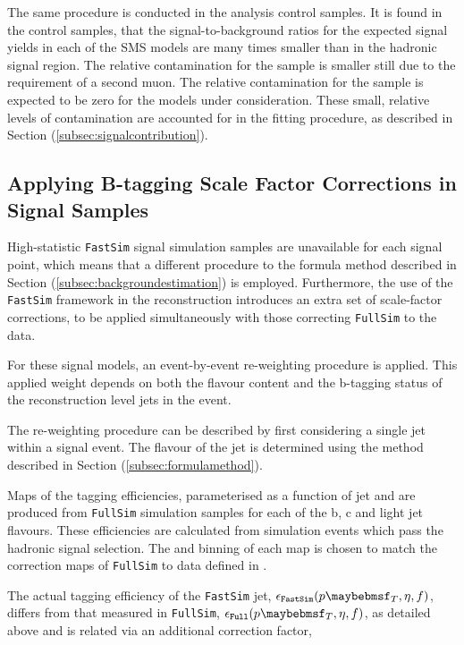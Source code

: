 The same procedure is conducted in the analysis control samples. It is found in the \mupjets control samples, that the signal-to-background ratios for the expected signal yields in each of the \ac{SMS} models are many times smaller than in the hadronic signal region. The relative contamination for the \dimupjets sample is smaller still due to the requirement of a second muon. The relative contamination for the \gpjets sample is expected to be zero for the models under consideration. These small, relative levels of contamination are accounted for in the fitting procedure, as described in Section (\ref{subsec:signalcontribution}).


\subsection{Applying B-tagging Scale Factor Corrections in Signal Samples}
\label{subsec:smsbtagreweighting}

High-statistic \texttt{FastSim} signal simulation samples are unavailable for each signal point, which means that a different procedure to the formula method described in Section (\ref{subsec:backgroundestimation}) is employed. Furthermore, the use of the \texttt{FastSim} framework in the reconstruction introduces an extra set of scale-factor corrections, to be applied simultaneously with those correcting \texttt{FullSim} to the data. 

For these signal models, an event-by-event re-weighting procedure is applied. This applied weight depends on both the flavour content and the b-tagging status of the reconstruction level jets in the event. 

The re-weighting procedure can be described by first considering a single jet within a signal event. The flavour of the jet is determined using the method described in Section (\ref{subsec:formulamethod}). 

Maps of the tagging efficiencies, parameterised as a function of jet \pt and \eta are produced from \texttt{FullSim} simulation samples for each of the b, c and light jet flavours. These efficiencies are calculated from simulation events which pass the hadronic signal selection. The \pt and \eta binning of each map is chosen to match the correction maps of \texttt{FullSim} to data defined in \cite{btagscalefactor}. 

The actual tagging efficiency of the \texttt{FastSim} jet, $\epsilon_{\texttt{FastSim}}(\pt,\eta,f)$, differs from that measured in \texttt{FullSim},  $\epsilon_{\texttt{Full}}(\pt,\eta,f)$, as detailed above and is related via an additional correction factor,

